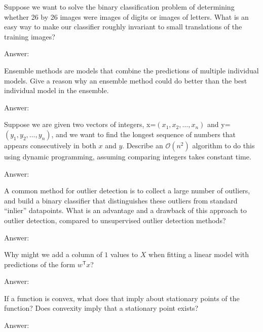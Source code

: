 \documentclass{article}
\newcommand{\ask}[1]{\textcolor{question}{#1}}
\newenvironment{answer}{\par\begingroup\color{answer}Answer: }{\endgroup}
\newcommand{\TODO}{\color{red}{TODO}}
\newcommand{\bigO}{\mathcal{O}}
\newcommand{\tp}{^\mathsf{T}}
\begin{document}
\begin{qlist}

\item  Suppose we want to solve the binary classification problem of determining whether 26 by 26 images were images of digits or images of letters. \ask{What is an easy way to make our classifier roughly invariant to small translations of the training images?}
\begin{answer}\TODO\end{answer}

\item Ensemble methods are models that combine the predictions of multiple individual models. \ask{Give a reason why an ensemble method could do better than the best individual model in the ensemble.}
\begin{answer}\TODO\end{answer}

\item Suppose we are given two vectors of integers, x=$(x_1,x_2,\dots,x_n)$ and y=$(y_1,y_2,\dots,y_n)$, and we want to find the longest sequence of numbers that appears consecutively in both $x$ and $y$. \ask{Describe an $\bigO(n^2)$ algorithm to do this using dynamic programming}, assuming comparing integers takes constant time.
\begin{answer}\TODO\end{answer}

\item A common method for outlier detection is to collect a large number of outliers, and build a binary classifier that distinguishes these outliers from standard ``inlier'' datapoints. \ask{What is an advantage and a drawback of this approach to outlier detection, compared to unsupervised outlier detection methods?}
\begin{answer}\TODO\end{answer}

\item \ask{Why might we add a column of $1$ values to $X$ when fitting a linear model with predictions of the form $w\tp x$?}
\begin{answer}\TODO\end{answer}

\item \ask{If a function is convex, what does that imply about stationary points of the function? Does convexity imply that a stationary point exists?}
\begin{answer}\TODO\end{answer}


\end{qlist}
\end{document}
